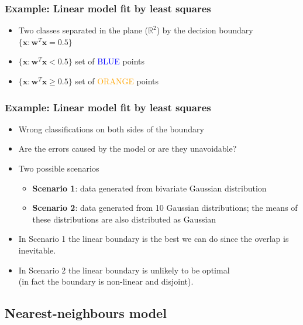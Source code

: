 \documentclass[notes]{beamer}          %
\newcommand{\vect}[1]{\bm{#1}}
\newcommand{\field}[1]{\mathbb{#1}}
\newcommand{\R}{\field{R}}
\begin{document}
\begin{frame}
\frametitle{Example: Linear model fit by least squares}
\begin{itemize}
    \item Two classes separated in the plane ($\R^2$) by the decision boundary $\{ \vect{x} : \vect{w}^T\vect{x} = 0.5 \}$
    \item $\{ \vect{x} : \vect{w}^T\vect{x} < 0.5 \}$ set of \textcolor{blue}{BLUE} points
    \item $\{ \vect{x} : \vect{w}^T\vect{x} \geq 0.5 \}$ set of \textcolor{orange}{ORANGE} points

\end{itemize}

\end{frame}

\begin{frame}
\frametitle{Example: Linear model fit by least squares}
\begin{itemize}
    \item Wrong classifications on both sides of the boundary
    \item Are the errors caused by the model or are they unavoidable?
    \item Two possible scenarios
        \begin{itemize}
            \item {\bf Scenario 1}: data generated from bivariate Gaussian distribution
            \item {\bf Scenario 2}: data generated from 10 Gaussian distributions; the means of these distributions are also distributed as Gaussian
        \end{itemize}
    \item In Scenario 1 the linear boundary is the best we can do since the overlap is inevitable.
    \item In Scenario 2 the linear boundary is unlikely to be optimal \\
          (in fact the boundary is non-linear and disjoint).
\end{itemize}

\end{frame}

\subsection{Nearest-neighbours model}
\end{document}
